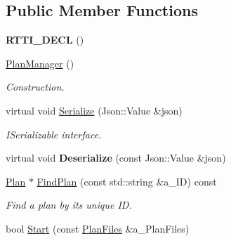 \subsection*{Public Member Functions}
\begin{DoxyCompactItemize}
\item 
\mbox{\label{class_plan_manager_a5a60e702c521f199f802482101a6b3de}} 
{\bfseries R\+T\+T\+I\+\_\+\+D\+E\+CL} ()
\item 
\mbox{\label{class_plan_manager_a4ca8ee77bcfd4b0fabecfca2cea0afcb}} 
\hyperlink{class_plan_manager_a4ca8ee77bcfd4b0fabecfca2cea0afcb}{Plan\+Manager} ()
\begin{DoxyCompactList}\small\item\em Construction. \end{DoxyCompactList}\item 
\mbox{\label{class_plan_manager_a897eaed2a85ff87f574f8672a10a0e8c}} 
virtual void \hyperlink{class_plan_manager_a897eaed2a85ff87f574f8672a10a0e8c}{Serialize} (Json\+::\+Value \&json)
\begin{DoxyCompactList}\small\item\em I\+Serializable interface. \end{DoxyCompactList}\item 
\mbox{\label{class_plan_manager_a09d4f5cf5d2369705d80bba33cd9af84}} 
virtual void {\bfseries Deserialize} (const Json\+::\+Value \&json)
\item 
\mbox{\label{class_plan_manager_ac26f5359b90f876f8f55bc0e90f936c9}} 
\hyperlink{class_plan}{Plan} $\ast$ \hyperlink{class_plan_manager_ac26f5359b90f876f8f55bc0e90f936c9}{Find\+Plan} (const std\+::string \&a\+\_\+\+ID) const
\begin{DoxyCompactList}\small\item\em Find a plan by it\textquotesingle{}s unique ID. \end{DoxyCompactList}\item 
\mbox{\label{class_plan_manager_a04194595729eafc14466fdc305342a9e}} 
bool \hyperlink{class_plan_manager_a04194595729eafc14466fdc305342a9e}{Start} (const \hyperlink{class_plan_manager_a2b39636cced4cfd897b38adc822deaf4}{Plan\+Files} \&a\+\_\+\+Plan\+Files)

\end{DoxyCompactItemize}

